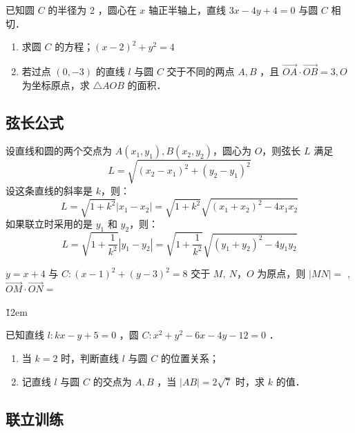 \begin{example}
    已知圆 $C$ 的半径为 2 ，圆心在 $x$ 轴正半轴上，直线 $3 x-4 y+4=0$ 与圆 $C$ 相切．
    \begin{enumerate}
        \item 求圆 $C$ 的方程；$(x-2)^2+y^2=4$
        \item 若过点 $(0,-3)$ 的直线 $l$ 与圆 $C$ 交于不同的两点 $A, B$ ，且 $\overrightarrow{O A} \cdot \overrightarrow{O B}=3, O$ 为坐标原点，求 $\triangle A O B$ 的面积．
    \end{enumerate}
\end{example}

\vspace{10em}

\subsection{弦长公式}

\begin{theorem}[弦长公式]
    设直线和圆的两个交点为 $A(x_1, y_1), B(x_2, y_2)$，圆心为 $O$，则弦长 $L$ 满足
    \[
        L = \sqrt{(x_2 - x_1)^2 + (y_2 - y_1)^2}
    \]
    设这条直线的斜率是 $k$，则：
    $$
        L = \sqrt{1+k^2}|x_1-x_2| = \sqrt{1+k^2}\sqrt{(x_1+x_2)^2-4x_1x_2}
    $$
    如果联立时采用的是 $y_1$ 和 $y_2$，则：
    $$
        L = \sqrt{1+\frac{1}{k^2}}|y_1-y_2| = \sqrt{1+\frac{1}{k^2}}\sqrt{(y_1 + y_2)^2 - 4y_1y_2}
    $$
\end{theorem}

\begin{example}
    $y=x+4$ 与 $C:(x-1)^2+(y-3)^2=8$ 交于 $M, ~ N$，$O$ 为原点，则 $|M N|=$ \underline{\qquad} , $\overrightarrow{O M} \cdot \overrightarrow{O N}=$ \underline{\qquad}
\end{example}

\v{12em}

\begin{example}
    已知直线 $l: k x-y+5=0$ ，圆 $C: x^2+y^2-6 x-4 y-12=0$ ．
    \begin{enumerate}
        \item 当 $k=2$ 时，判断直线 $l$ 与圆 $C$ 的位置关系；
        \item 记直线 $l$ 与圆 $C$ 的交点为 $A, B$ ，当 $|A B|=2 \sqrt{7}$ 时，求 $k$ 的值．
    \end{enumerate}
\end{example}

\vspace{10em}

\subsection*{联立训练}


